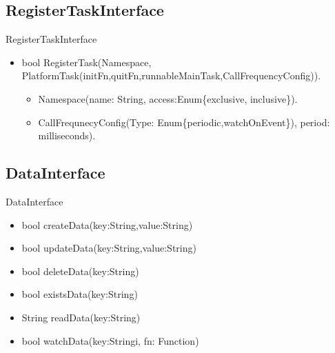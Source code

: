 \documentclass{beamer}
\begin{document}
\subsection {RegisterTaskInterface}
\begin{frame}
	\begin{block}{RegisterTaskInterface}
		\begin{itemize}
			\item bool \alert{RegisterTask}(Namespace, PlatformTask(initFn,quitFn,runnableMainTask,CallFrequencyConfig)).
			\begin{itemize}
				\item Namespace(name: String, access:Enum\{exclusive, inclusive\}).
				\item CallFrequnecyConfig(Type: Enum\{periodic,watchOnEvent\}), period: milliseconds).
			\end{itemize}
		\end{itemize}
	\end{block}
\end{frame}


\subsection {DataInterface}
\begin{frame}
\begin{block}{DataInterface}
		\begin{itemize}
			\item bool \alert{createData}(key:String,value:String)
			\item bool \alert{updateData}(key:String,value:String)
			\item bool \alert{deleteData}(key:String)
			\item bool \alert{existsData}(key:String)
			\item String \alert{readData}(key:String)
			\item bool \alert{watchData}(key:Stringi, fn: Function)
		\end{itemize}
	\end{block}

\end{frame}
\end{document}
